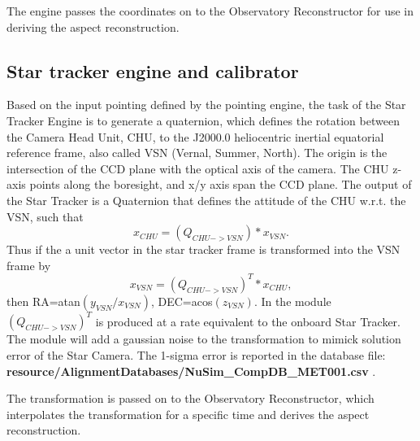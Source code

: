 The engine passes the coordinates on to the Observatory Reconstructor for use in deriving the aspect reconstruction.

\subsection{Star tracker engine and calibrator}
Based on the input pointing defined by the pointing engine, the task of the Star Tracker Engine is to generate a quaternion, which defines the rotation between the Camera Head Unit, CHU, to the J2000.0 heliocentric inertial equatorial reference frame, also called VSN (Vernal, Summer, North). The origin is the intersection of the CCD plane with the optical axis of the camera. The CHU z-axis points along the boresight, and x/y axis span the CCD plane.
The output of the Star Tracker is a Quaternion that defines the attitude of the CHU w.r.t. the VSN, such that
\begin{equation} 
x_{CHU}=(Q_{CHU->VSN}) * x_{VSN}. 
\end{equation}
Thus if the a unit vector in the star tracker frame is transformed into the VSN frame by 
\begin{equation}
x_{VSN}=(Q_{CHU->VSN} )^T* x_{CHU}, 
\end{equation}
then RA=atan$(y_{VSN}/x_{VSN})$, DEC=acos$(z_{VSN})$. In the module $(Q_{CHU->VSN})^T$ is produced at a rate equivalent to the onboard Star Tracker. The module will add a gaussian noise to the transformation to mimick solution error of the Star Camera. The 1-sigma error is reported in the database file:\\ \textbf{resource/AlignmentDatabases/NuSim\_CompDB\_MET001.csv} .

 The transformation is passed on to the Observatory Reconstructor, which interpolates the transformation for a specific time and derives the aspect reconstruction.

